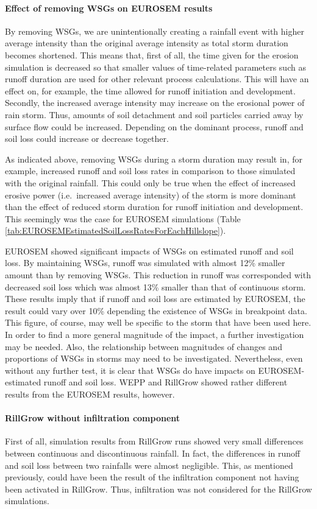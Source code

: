 \paragraph{Effect of removing WSGs on EUROSEM results} By removing WSGs, we
are unintentionally creating a rainfall event with higher average intensity than
the original average intensity as total storm duration becomes shortened. This
means that, first of all, the time given for the erosion simulation is decreased
so that smaller values of time-related parameters such as runoff duration are
used for other relevant process calculations. This will have an effect on, for
example, the time allowed for runoff initiation and development. Secondly, the
increased average intensity may increase on the erosional power of rain
storm. Thus, amounts of soil detachment and soil particles carried away by
surface flow could be increased. Depending on the dominant process, runoff and
soil loss could increase or decrease together.

As indicated above, removing WSGs during a storm duration may result in, for
example, increased runoff and soil loss rates in comparison to those simulated
with the original rainfall. This could only be true when the effect of increased
erosive power (i.e.\ increased average intensity) of the storm is more dominant
than the effect of reduced storm duration for runoff initiation and development.
This seemingly was the case for EUROSEM simulations (Table
\ref{tab:EUROSEMEstimatedSoilLossRatesForEachHillslope}).

EUROSEM showed significant impacts of WSGs on estimated runoff and soil loss. By
maintaining WSGs, runoff was simulated with almost 12\% smaller amount than by
removing WSGs. This reduction in runoff was corresponded with decreased soil
loss which was almost 13\% smaller than that of continuous storm. These results
imply that if runoff and soil loss are estimated by EUROSEM, the result could
vary over 10\% depending the existence of WSGs in breakpoint data. This figure,
of course, may well be specific to the storm that have been used here. In order
to find a more general magnitude of the impact, a further investigation may be
needed. Also, the relationship between magnitudes of changes and proportions of
WSGs in storms may need to be investigated. Nevertheless, even without any
further test, it is clear that WSGs do have impacts on EUROSEM-estimated runoff
and soil loss.
WEPP and RillGrow showed rather different results from the EUROSEM results,
however.

\paragraph{RillGrow without infiltration component} First of all, simulation
results from RillGrow runs showed very small differences between continuous and
discontinuous rainfall. In fact, the differences in runoff and soil loss between
two rainfalls were almost negligible. This, as mentioned previously, could have
been the result of the infiltration component not having been activated in
RillGrow. Thus, infiltration was not considered for the RillGrow simulations.

